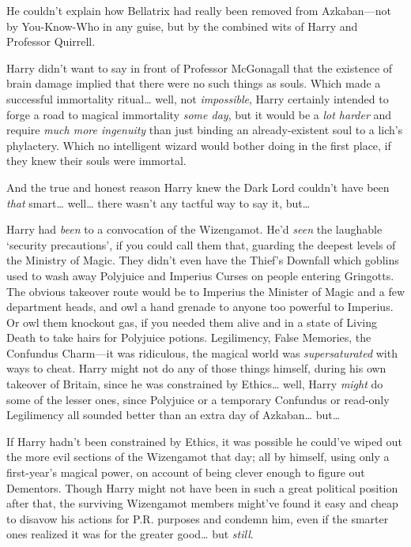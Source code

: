 He couldn't explain how Bellatrix had really been removed from Azkaban—not by You-Know-Who in any guise, but by the combined wits of Harry and Professor Quirrell.

Harry didn't want to say in front of Professor McGonagall that the existence of brain damage implied that there were no such things as souls. Which made a successful immortality ritual{\ldots} well, not \emph{impossible}, Harry certainly intended to forge a road to magical immortality \emph{some day}, but it would be a \emph{lot harder} and require \emph{much more ingenuity} than just binding an already-existent soul to a lich's phylactery. Which no intelligent wizard would bother doing in the first place, if they knew their souls were immortal.

And the true and honest reason Harry knew the Dark Lord couldn't have been \emph{that} smart{\ldots} well{\ldots} there wasn't any tactful way to say it, but{\ldots}

Harry had \emph{been} to a convocation of the Wizengamot. He'd \emph{seen} the laughable `security precautions', if you could call them that, guarding the deepest levels of the Ministry of Magic. They didn't even have the Thief's Downfall which goblins used to wash away Polyjuice and Imperius Curses on people entering Gringotts. The obvious takeover route would be to Imperius the Minister of Magic and a few department heads, and owl a hand grenade to anyone too powerful to Imperius. Or owl them knockout gas, if you needed them alive and in a state of Living Death to take hairs for Polyjuice potions. Legilimency, False Memories, the Confundus Charm—it was ridiculous, the magical world was \emph{supersaturated} with ways to cheat. Harry might not do any of those things himself, during his own takeover of Britain, since he was constrained by Ethics{\ldots} well, Harry \emph{might} do some of the lesser ones, since Polyjuice or a temporary Confundus or read-only Legilimency all sounded better than an extra day of Azkaban{\ldots} but{\ldots}

If Harry hadn't been constrained by Ethics, it was possible he could've wiped out the more evil sections of the Wizengamot that day; all by himself, using only a first-year's magical power, on account of being clever enough to figure out Dementors. Though Harry might not have been in such a great political position after that, the surviving Wizengamot members might've found it easy and cheap to disavow his actions for P.R. purposes and condemn him, even if the smarter ones realized it was for the greater good{\ldots} but \emph{still}.


